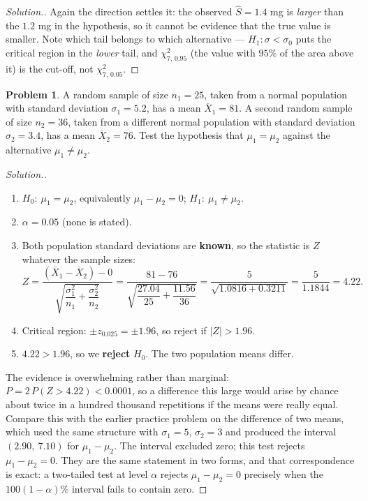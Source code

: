 \documentclass[11pt,a4paper]{article}
\theoremstyle{definition}
\newtheorem{problemx}{Problem}[section]
\newenvironment{problem}{\begin{problemx}}{\end{problemx}}
\newenvironment{solution}
  {\renewcommand{\qedsymbol}{}\begin{proof}[\textit{Solution}.]}
  {\end{proof}}
\begin{document}
\begin{solution}
Again the direction settles it: the observed $\hat{S}=1.4$ mg is \emph{larger} than the
$1.2$ mg in the hypothesis, so it cannot be evidence that the true value is smaller. Note
which tail belongs to which alternative --- $H_1:\sigma<\sigma_0$ puts the critical region
in the \emph{lower} tail, and $\chi^2_{7,\,0.95}$ (the value with $95\%$ of the area above
it) is the cut-off, not $\chi^2_{7,\,0.05}$.
\end{solution}

\begin{problem}
A random sample of size $n_1=25$, taken from a normal population with standard deviation
$\sigma_1=5.2$, has a mean $\overline{X}_1=81$. A second random sample of size $n_2=36$,
taken from a different normal population with standard deviation $\sigma_2=3.4$, has a mean
$\overline{X}_2=76$. Test the hypothesis that $\mu_1=\mu_2$ against the alternative
$\mu_1\neq\mu_2$.
\end{problem}

\begin{solution}
\begin{enumerate}
\item $H_0:\ \mu_1=\mu_2$, equivalently $\mu_1-\mu_2=0$; $H_1:\ \mu_1\neq\mu_2$.
\item $\alpha=0.05$ (none is stated).
\item Both population standard deviations are \textbf{known}, so the statistic is $Z$
whatever the sample sizes:
\[Z=\frac{(\overline{X}_1-\overline{X}_2)-0}
{\sqrt{\dfrac{\sigma_1^2}{n_1}+\dfrac{\sigma_2^2}{n_2}}}
=\frac{81-76}{\sqrt{\dfrac{27.04}{25}+\dfrac{11.56}{36}}}
=\frac{5}{\sqrt{1.0816+0.3211}}=\frac{5}{1.1844}=4.22.\]
\item Critical region: $\pm z_{0.025}=\pm 1.96$, so reject if $|Z|>1.96$.
\item $4.22>1.96$, so we \textbf{reject} $H_0$. The two population means differ.
\end{enumerate}

The evidence is overwhelming rather than marginal: $P=2\,P(Z>4.22)<0.0001$, so a difference
this large would arise by chance about twice in a hundred thousand repetitions if the means
were really equal. Compare this with the earlier practice problem on the difference of two means, which used the same structure with
$\sigma_1=5$, $\sigma_2=3$ and produced the interval $(2.90,\ 7.10)$ for $\mu_1-\mu_2$. The
interval excluded zero; this test rejects $\mu_1-\mu_2=0$. They are the same statement in
two forms, and that correspondence is exact: a two-tailed test at level $\alpha$ rejects
$\mu_1-\mu_2=0$ precisely when the $100(1-\alpha)\%$ interval fails to contain zero.
\end{solution}
\end{document}
